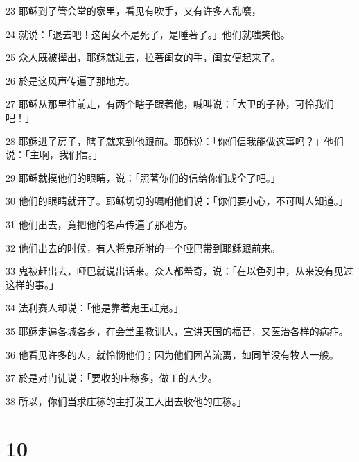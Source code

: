 \par 23 耶稣到了管会堂的家里，看见有吹手，又有许多人乱嚷，
\par 24 就说：「退去吧！这闺女不是死了，是睡著了。」他们就嗤笑他。
\par 25 众人既被撵出，耶稣就进去，拉著闺女的手，闺女便起来了。
\par 26 於是这风声传遍了那地方。
\par 27 耶稣从那里往前走，有两个瞎子跟著他，喊叫说：「大卫的子孙，可怜我们吧！」
\par 28 耶稣进了房子，瞎子就来到他跟前。耶稣说：「你们信我能做这事吗？」他们说：「主啊，我们信。」
\par 29 耶稣就摸他们的眼睛，说：「照著你们的信给你们成全了吧。」
\par 30 他们的眼睛就开了。耶稣切切的嘱咐他们说：「你们要小心，不可叫人知道。」
\par 31 他们出去，竟把他的名声传遍了那地方。
\par 32 他们出去的时候，有人将鬼所附的一个哑巴带到耶稣跟前来。
\par 33 鬼被赶出去，哑巴就说出话来。众人都希奇，说：「在以色列中，从来没有见过这样的事。」
\par 34 法利赛人却说：「他是靠著鬼王赶鬼。」
\par 35 耶稣走遍各城各乡，在会堂里教训人，宣讲天国的福音，又医治各样的病症。
\par 36 他看见许多的人，就怜悯他们；因为他们困苦流离，如同羊没有牧人一般。
\par 37 於是对门徒说：「要收的庄稼多，做工的人少。
\par 38 所以，你们当求庄稼的主打发工人出去收他的庄稼。」

\chapter{10}

